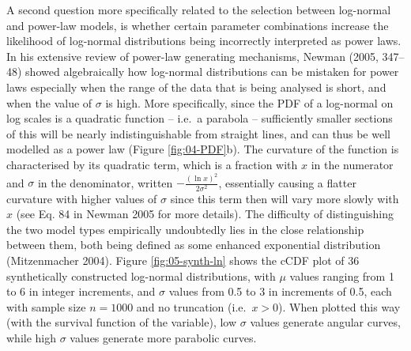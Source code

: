 \documentclass[
  12pt,
  a4paper, twoside]{book}
\begin{document}
A second question more specifically related to the selection between log-normal and power-law models, is whether certain parameter combinations increase the likelihood of log-normal distributions being incorrectly interpreted as power laws. In his extensive review of power-law generating mechanisms, Newman (2005, 347--48) showed algebraically how log-normal distributions can be mistaken for power laws especially when the range of the data that is being analysed is short, and when the value of \(\sigma\) is high. More specifically, since the PDF of a log-normal on log scales is a quadratic function -- i.e.~a parabola -- sufficiently smaller sections of this will be nearly indistinguishable from straight lines, and can thus be well modelled as a power law (Figure \ref{fig:04-PDF}b). The curvature of the function is characterised by its quadratic term, which is a fraction with \(x\) in the numerator and \(\sigma\) in the denominator, written \(-\frac{(\ln x)^2}{2\sigma^2}\), essentially causing a flatter curvature with higher values of \(\sigma\) since this term then will vary more slowly with \(x\) (see Eq. 84 in Newman 2005 for more details). The difficulty of distinguishing the two model types empirically undoubtedly lies in the close relationship between them, both being defined as some enhanced exponential distribution (Mitzenmacher 2004). Figure \ref{fig:05-synth-ln} shows the cCDF plot of 36 synthetically constructed log-normal distributions, with \(\mu\) values ranging from 1 to 6 in integer increments, and \(\sigma\) values from 0.5 to 3 in increments of 0.5, each with sample size \(n = 1000\) and no truncation (i.e.~\(x > 0\)). When plotted this way (with the survival function of the variable), low \(\sigma\) values generate angular curves, while high \(\sigma\) values generate more parabolic curves.
\end{document}
